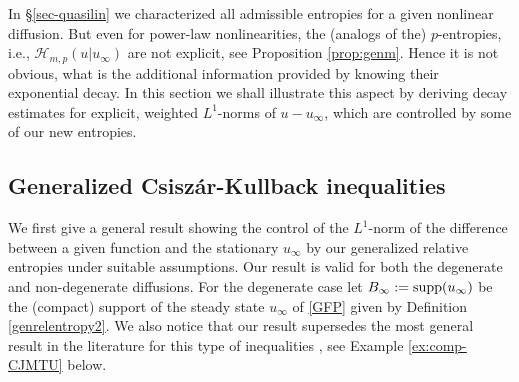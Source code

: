 \documentclass[reqno]{amsart}
\newcommand{\uinf}{u_\infty}
\begin{document}
In \S\ref{sec-quasilin} we characterized all admissible entropies for a given nonlinear diffusion. But even for power-law nonlinearities, the (analogs of the) $p$-entropies, i.e.,   $\mathcal{H}_{m,p}(u|\uinf)$ are not explicit, see Proposition \ref{prop:genm}. Hence it is not obvious, what is the additional information provided by knowing their exponential decay. In this section we shall illustrate this aspect by deriving decay estimates for explicit, weighted $L^1$-norms of $u-\uinf$, which are controlled by some of our new entropies.

\subsection{Generalized Csiszár-Kullback inequalities}
We first give a general result showing the control of the $L^1$-norm of the difference between a given function and the stationary $\uinf$ by our generalized relative entropies under suitable assumptions. Our result is valid for both the degenerate and non-degenerate diffusions. 
For the degenerate case let $B_\infty:=\mbox{\rm supp} (\uinf)$ be the (compact) support of the steady state $\uinf$ of \eqref{GFP} given by Definition \ref{genrelentropy2}. 
We also notice that our result supersedes the most general result in the literature for this type of inequalities \cite{AMTU2,CJMTU}, see Example \ref{ex:comp-CJMTU} below.
\end{document}
